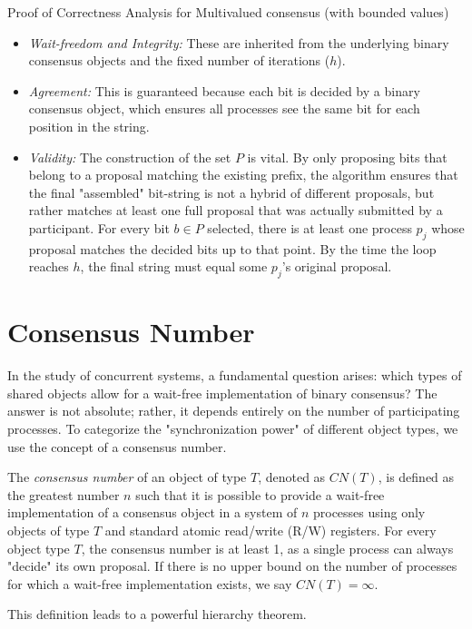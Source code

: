 \begin{Demonstration}{Proof of Correctness Analysis for Multivalued consensus (with bounded values)}{}
\begin{itemize}
    \item \textit{Wait-freedom and Integrity:} These are inherited from the underlying binary consensus objects and the fixed number of iterations ($h$).
    \item \textit{Agreement:} This is guaranteed because each bit is decided by a binary consensus object, which ensures all processes see the same bit for each position in the string.
    \item \textit{Validity:} The construction of the set $P$ is vital. By only proposing bits that belong to a proposal matching the existing prefix, the algorithm ensures that the final "assembled" bit-string is not a hybrid of different proposals, but rather matches at least one full proposal that was actually submitted by a participant. For every bit $b\in P$ selected, there is at least one process $p_j$ whose proposal matches the decided bits up to that point. By the time the loop reaches $h$, the final string must equal some $p_j$'s original proposal.
\end{itemize}
\end{Demonstration}

\chapter{Consensus Number}
In the study of concurrent systems, a fundamental question arises: which types of shared objects allow for a wait-free implementation of binary consensus? The answer is not absolute; rather, it depends entirely on the number of participating processes. To categorize the "synchronization power" of different object types, we use the concept of a consensus number.

The \textit{consensus number} of an object of type $T$, denoted as $CN(T)$, is defined as the greatest number $n$ such that it is possible to provide a wait-free implementation of a consensus object in a system of $n$ processes using only objects of type $T$ and standard atomic read/write (R/W) registers. For every object type $T$, the consensus number is at least 1, as a single process can always "decide" its own proposal. If there is no upper bound on the number of processes for which a wait-free implementation exists, we say $CN(T)=\infty$.

This definition leads to a powerful hierarchy theorem.

